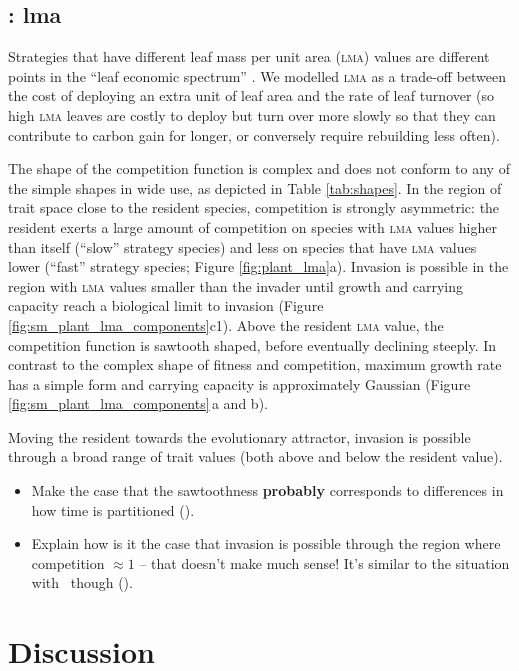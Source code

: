 \documentclass[a4paper,11pt]{article}
\begin{document}
\subsection{\plant: lma}
Strategies that have different leaf mass per unit area (\textsc{lma})
values are different points in the ``leaf economic spectrum''
\citep{Reich-1997,Wright-2004}.  We modelled \textsc{lma} as a trade-off
between the cost of deploying an extra unit
of leaf area and the rate of leaf turnover (so high \textsc{lma} leaves are
costly to deploy but turn over more slowly so that they can contribute
to carbon gain for longer, or conversely require rebuilding less
often).

The shape of the competition function is complex and does not conform
to any of the simple shapes in wide use, as depicted in Table \ref{tab:shapes}.
In the region of trait space close to the resident species,
competition is strongly asymmetric: the resident exerts a large amount
of competition on species with \textsc{lma} values higher than itself (``slow''
strategy species) and less on species that have \textsc{lma} values lower
(``fast'' strategy species; Figure \ref{fig:plant_lma}a).  Invasion is
possible in the region with \textsc{lma} values smaller than the invader until
growth and carrying capacity reach a biological limit to invasion
(Figure \ref{fig:sm_plant_lma_components}c1).
%
Above the resident \textsc{lma} value, the competition function is sawtooth
shaped, before eventually declining steeply.
%
In contrast to the complex shape of fitness and competition, maximum
growth rate has a simple form and carrying capacity is approximately
Gaussian (Figure \ref{fig:sm_plant_lma_components}\,a and b).

Moving the resident towards the evolutionary attractor, invasion is
possible through a broad range of trait values (both above and below
the resident value).
\begin{itemize}
\item Make the case that the sawtoothness \textbf{probably} corresponds to
  differences in how time is partitioned (\TODO).

\item Explain how is it the case that invasion is possible through the
  region where competition $\approx 1$ -- that doesn't make much sense!
  It's similar to the situation with \hmat\ though (\TODO).
\end{itemize}

\section{Discussion}
\end{document}
